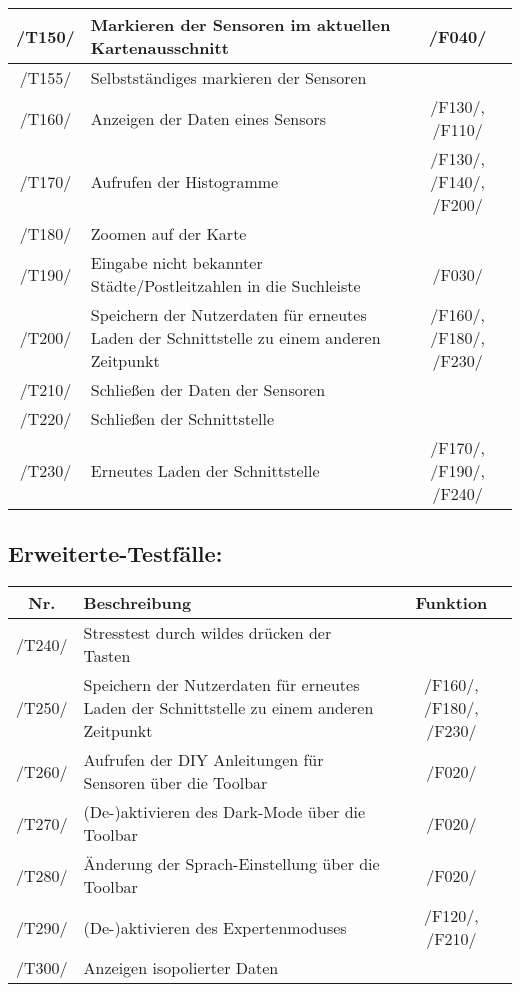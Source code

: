 \begin{tabularx}{\textwidth}{| c | X | c |}
     \hline
     /T150/ & Markieren der Sensoren im aktuellen Kartenausschnitt & /F040/\\
     \hline 
     /T155/ & Selbstständiges markieren der Sensoren & \\
     \hline
     /T160/ & Anzeigen der Daten eines Sensors &  /F130/, /F110/\\
     \hline
     /T170/ & Aufrufen der Histogramme & /F130/, /F140/, /F200/\\
     \hline
     /T180/ & Zoomen auf der Karte & \\
     \hline
     /T190/ & Eingabe nicht bekannter Städte/Postleitzahlen in die Suchleiste & /F030/\\
     \hline
     /T200/ & Speichern der Nutzerdaten für erneutes Laden der Schnittstelle zu einem anderen Zeitpunkt & /F160/, /F180/, /F230/ \\
     \hline
     /T210/ & Schließen der Daten der Sensoren & \\
     \hline
     /T220/ & Schließen der Schnittstelle & \\
     \hline
     /T230/ & Erneutes Laden der Schnittstelle & /F170/, /F190/, /F240/\\
     \hline
    \end{tabularx}

\subsection{Erweiterte-Testfälle:}
\begin{tabularx}{\textwidth}{| c | X | c |}
    \hline
    \textbf{Nr.} & 
    \textbf{Beschreibung} &
    \textbf{Funktion}\\
    \hline 
    /T240/ & Stresstest durch wildes drücken der Tasten & \\
    \hline      
    /T250/ & Speichern der Nutzerdaten für erneutes Laden der Schnittstelle zu einem anderen Zeitpunkt & /F160/, /F180/, /F230/ \\
    \hline  
    /T260/ & Aufrufen der DIY Anleitungen für Sensoren über die Toolbar & /F020/\\
    \hline
    /T270/ & (De-)aktivieren des Dark-Mode über die Toolbar & /F020/\\
    \hline
    /T280/ & Änderung der Sprach-Einstellung über die Toolbar & /F020/\\
    \hline
    /T290/ & (De-)aktivieren des Expertenmoduses & /F120/, /F210/\\
    \hline
    /T300/ & Anzeigen isopolierter Daten & \\
    \hline
\end{tabularx}


